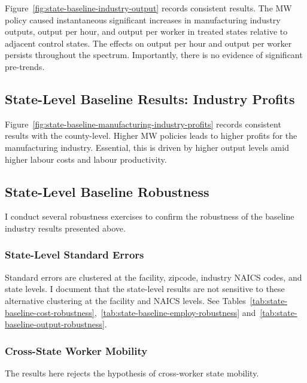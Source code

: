 \documentclass[authoryear, preprint, twocolumn, 1p]{elsarticle}
\begin{document}
    Figure~\ref{fig:state-baseline-industry-output} records consistent results. The MW policy caused instantaneous significant increases in manufacturing industry outputs, output per hour, and output per worker in treated states relative to adjacent control states. The effects on output per hour and output per worker persists throughout the spectrum. Importantly, there is no evidence of significant pre-trends.
    
    

    \subsection{State-Level Baseline Results: Industry Profits}\label{subsec:state-level-baseline-results-industry-profits}
    Figure~\ref{fig:state-baseline-manufacturing-industry-profits} records consistent results with the county-level. Higher MW policies leads to higher profits for the manufacturing industry. Essential, this is driven by higher output levels amid higher labour costs and labour productivity.
    

    \subsection{State-Level Baseline Robustness}\label{subsec:state-level-baseline-robustness}
    I conduct several robustness exercises to confirm the robustness of the baseline industry results presented above.

    \subsubsection{State-Level Standard Errors} Standard errors are clustered at the facility, zipcode, industry NAICS codes, and state levels. I document that the state-level results are not sensitive to these alternative clustering at the facility and NAICS levels. See Tables~\ref{tab:state-baseline-cost-robustness},~\ref{tab:state-baseline-employ-robustness} and~\ref{tab:state-baseline-output-robustness}.
    
    
    

    \subsubsection{Cross-State Worker Mobility}\label{subsubsec:cross-state-worker-mobility}
    The results here rejects the hypothesis of cross-worker state mobility.
    
\end{document}
